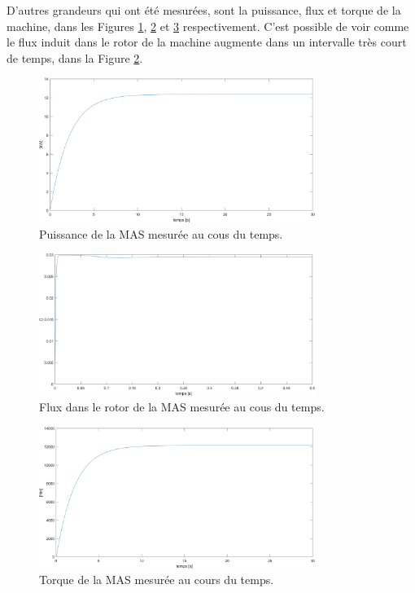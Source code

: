 D'autres grandeurs qui ont été mesurées, sont la puissance, flux et torque de la machine, dans les Figures \ref{img-simuMatlab-P}, \ref{img-simuMatlab-phi_r} et \ref{img-simuMatlab-torque} respectivement. C'est possible de voir comme le flux induit dans le rotor de la machine augmente dans un intervalle très court de temps, dans la Figure \ref{img-simuMatlab-phi_r}.


\begin{figure}[!h]
    \centering
    \includegraphics[width=0.8\textwidth]{simusMATLAB/MAS/P.png} 
    \caption{Puissance de la MAS mesurée au cous du temps.}
    \label{img-simuMatlab-P}
\end{figure}




\begin{figure}[!h]
    \centering
    \includegraphics[width=0.8\textwidth]{simusMATLAB/MAS/phi_r.png} 
    \caption{Flux dans le rotor de la MAS mesurée au cous du temps.}
    \label{img-simuMatlab-phi_r}
\end{figure}



\begin{figure}[!h]
    \centering
    \includegraphics[width=0.8\textwidth]{simusMATLAB/MAS/torque.png} 
    \caption{Torque de la MAS mesurée au cours du temps.}
    \label{img-simuMatlab-torque}
\end{figure}

